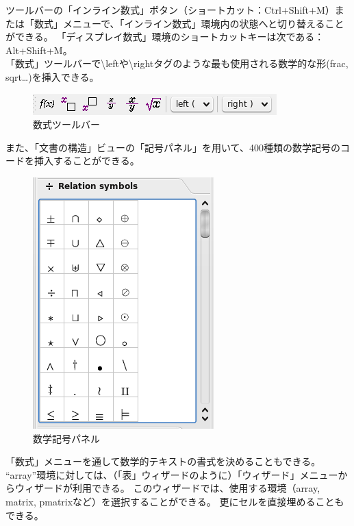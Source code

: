 \documentclass[]{book}
\makeatletter
\def\maxwidth{\ifdim\Gin@nat@width>\linewidth\linewidth
\else\Gin@nat@width\fi}
\let\Oldincludegraphics\includegraphics
\renewcommand{\includegraphics}[1]{\Oldincludegraphics[width=\maxwidth]{#1}}
\makeatother
\begin{document}
ツールバーの「インライン数式」ボタン（ショートカット：Ctrl+Shift+M）または「数式」メニューで、「インライン数式」環境内の状態へと切り替えることができる。
「ディスプレイ数式」環境のショートカットキーは次である：Alt+Shift+M。\\
「数式」ツールバーで\textbackslash{}leftや\textbackslash{}rightタグのような最も使用される数学的な形(frac,
sqrt\ldots{})を挿入できる。

\begin{figure}[htbp]
\centering
\includegraphics{doc11.png}
\caption{数式ツールバー}
\end{figure}

また、「文書の構造」ビューの「記号パネル」を用いて、400種類の数学記号のコードを挿入することができる。

\begin{figure}[htbp]
\centering
\includegraphics{doc12.png}
\caption{数学記号パネル}
\end{figure}

「数式」メニューを通して数学的テキストの書式を決めることもできる。\\
``array''環境に対しては、（「表」ウィザードのように）「ウィザード」メニューからウィザードが利用できる。
このウィザードでは、使用する環境（array, matrix,
pmatrixなど）を選択することができる。 更にセルを直接埋めることもできる。
\end{document}
